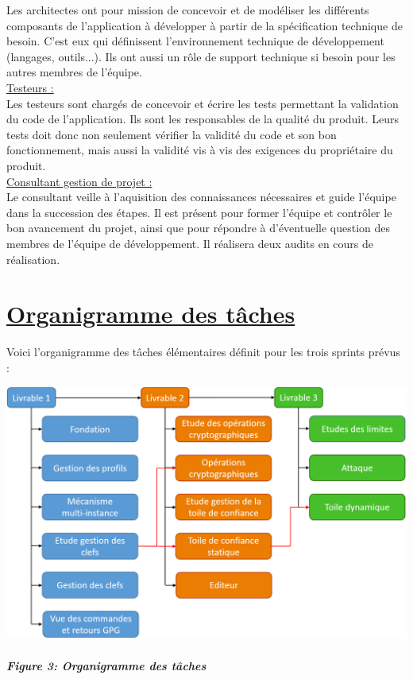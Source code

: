 \documentclass{../res/univ-projet}
\begin{document}
Les architectes ont pour mission de concevoir et de modéliser les différents composants de l'application à développer à partir de la spécification technique de besoin. 
C'est eux qui définissent l'environnement technique de développement (langages, outils...). Ils ont aussi un rôle de support technique si besoin pour les autres 
membres de l'équipe. \\

\underline{Testeurs :} \\

Les testeurs sont chargés de concevoir et écrire les tests permettant la validation du code de l'application. Ils sont les responsables de la qualité du produit. Leurs 
tests doit donc non seulement vérifier la validité du code et son bon fonctionnement, mais aussi la validité vis à vis des exigences du propriétaire du produit. \\
\newpage
\underline{Consultant gestion de projet :} \\

Le consultant veille à l'aquisition des connaissances nécessaires et guide l'équipe dans la succession des étapes. Il est présent pour former l'équipe et contrôler le bon 
avancement du projet, ainsi que pour répondre à d'éventuelle question des membres de l'équipe de développement. Il réalisera deux audits en cours de réalisation. \\

\section{\underline{Organigramme des tâches}}

Voici l'organigramme des tâches élémentaires définit pour les trois sprints prévus :

\begin{center}
 \includegraphics[scale=0.45]{./graphics/Organigramme_des_taches} \\~\\
 \textbf{\textit{Figure 3: Organigramme des tâches}}
\end{center}
\end{document}
